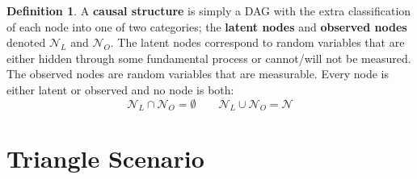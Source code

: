 \documentclass[aps, 10pt, english, twoside, pra, longbibliography]{revtex4-1}
\theoremstyle{plain}
\theoremstyle{definition}
\newtheorem{definition}[theorem]{Definition}
\theoremstyle{remark}
\newcommand{\nodes}{\mathcal{N}}
\newcommand{\term}[1]{\textcolor{Mahogany}{\textbf{#1}}}
\begin{document}
    \begin{definition}
        A \term{causal structure} is simply a DAG with the extra classification of each node into one of two categories; the \term{latent nodes} and \term{observed nodes} denoted $\nodes_L$ and $\nodes_O$. The latent nodes correspond to random variables that are either hidden through some fundamental process or cannot/will not be measured. The observed nodes are random variables that are measurable. Every node is either latent or observed and no node is both:
        \[ \nodes_L \cap \nodes_O = \emptyset \qquad \nodes_L \cup \nodes_O = \nodes \]
    \end{definition}


    \section{Triangle Scenario}
\end{document}
